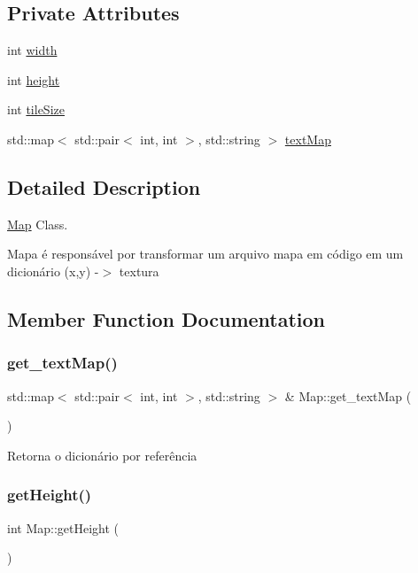 \subsection*{Private Attributes}
\begin{DoxyCompactItemize}
\item 
int \hyperlink{classMap_a9ecfe932ad2d2bc22492416033bdacfd}{width}
\item 
int \hyperlink{classMap_a0546fef98caebe38385bb2e0c7a15da1}{height}
\item 
int \hyperlink{classMap_ae686445a21a02aaf586633c5a69e8ff3}{tile\+Size}
\item 
std\+::map$<$ std\+::pair$<$ int, int $>$, std\+::string $>$ \hyperlink{classMap_ae2bfd5c888983cc73be6d9a4c3ad1bcf}{text\+Map}
\end{DoxyCompactItemize}


\subsection{Detailed Description}
\hyperlink{classMap}{Map} Class. 

Mapa é responsável por transformar um arquivo mapa em código em um dicionário (x,y) -\/$>$ textura 

\subsection{Member Function Documentation}
\mbox{\label{classMap_ac4b82fa93d76c5891fc18212cd3d9098}} 
\subsubsection{\texorpdfstring{get\+\_\+text\+Map()}{get\_textMap()}}
{\footnotesize\ttfamily std\+::map$<$ std\+::pair$<$ int, int $>$, std\+::string $>$ \& Map\+::get\+\_\+text\+Map (\begin{DoxyParamCaption}{ }\end{DoxyParamCaption})}

Retorna o dicionário por referência \mbox{\label{classMap_a2b09c8875af2efb711fc3a022e70427d}} 
\subsubsection{\texorpdfstring{get\+Height()}{getHeight()}}
{\footnotesize\ttfamily int Map\+::get\+Height (\begin{DoxyParamCaption}{ }\end{DoxyParamCaption})}

